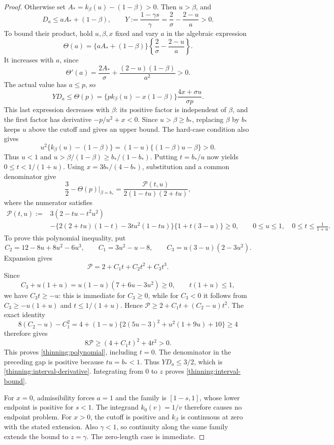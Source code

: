 \begin{proof}
Otherwise set $A_*=k_\beta(u)-(1-\beta)>0$.  Then $u>\beta$,
and
\[
 D_a\le aA_*+(1-\beta),\qquad
 Y:=\frac{1-\gamma s}{\gamma}
 =\frac2\sigma-\frac{2-u}{a}>0.
\]
To bound their product, hold $u,\beta,x$ fixed and vary $a$ in
the algebraic expression
\[
 \Theta(a)=\{aA_*+(1-\beta)\}
 \left\{\frac2\sigma-\frac{2-u}{a}\right\}.
\]
It increases with $a$, since
\[
 \Theta'(a)=\frac{2A_*}{\sigma}
 +\frac{(2-u)(1-\beta)}{a^2}>0.
\]
The actual value has $a\le p$, so
\begin{equation}
\label{thinning:transport-bound}
 YD_a\le\Theta(p)
 =\{p k_\beta(u)-x(1-\beta)\}
   \frac{4x+\sigma u}{\sigma p}.
\end{equation}
This last expression decreases with $\beta$: its positive factor
is independent of $\beta$, and the first factor has derivative
$-p/u^2+x<0$.  Since $u>\beta\ge b_*$, replacing $\beta$ by
$b_*$ keeps $u$ above the cutoff and gives an upper bound.
The hard-case condition also gives
\[
 u^2\{k_\beta(u)-(1-\beta)\}
 =(1-u)\{(1-\beta)u-\beta\}>0.
\]
Thus $u<1$ and
$u>\beta/(1-\beta)\ge b_*/(1-b_*)$.
Putting $t=b_*/u$ now yields $0\le t<1/(1+u)$.
Using $x=3b_*/(4-b_*)$, substitution and a common denominator give
\[
 \frac32-\left.\Theta(p)\right|_{\beta=b_*}
 =\frac{\mathcal P(t,u)}{2(1-tu)(2+tu)},
\]
where the numerator satisfies
\begin{equation}
\label{thinning:polynomial}
 \begin{split}
 \mathcal P(t,u):={}&3(2-tu-t^2u^2)\\
 &-\{2(2+tu)(1-t)-3tu^2(1-tu)\}\{1+t(3-u)\}\ge0,
 \qquad 0\le u\le1,\quad 0\le t\le\frac1{1+u}.
 \end{split}
\end{equation}
To prove this polynomial inequality, put
\[
 C_2=12-8u+8u^2-6u^3,\qquad C_1=3u^2-u-8,\qquad
 C_3=u(3-u)(2-3u^2).
\]
Expansion gives
\begin{equation}
\label{thinning:polynomial-decomposition}
 \mathcal P=2+C_1t+C_2t^2+C_3t^3.
\end{equation}
Since
\[
 C_3+u(1+u)=u(1-u)(7+6u-3u^2)\ge0,
 \qquad t(1+u)\le1,
\]
we have $C_3t\ge-u$: this is immediate for $C_3\ge0$, while for
$C_3<0$ it follows from $C_3\ge-u(1+u)$ and $t\le1/(1+u)$.
Hence $\mathcal P\ge2+C_1t+(C_2-u)t^2$.
The exact identity
\[
 8(C_2-u)-C_1^2
 =4+(1-u)\{2(5u-3)^2+u^2(1+9u)+10\}\ge4
\]
therefore gives
\[
 8\mathcal P\ge(4+C_1t)^2+4t^2>0.
\]
This proves \eqref{thinning:polynomial}, including $t=0$.
The denominator in the preceding gap is positive because
$tu=b_*<1$. Thus $YD_a\le3/2$,
which is \eqref{thinning:interval-derivative}.
Integrating from $0$ to $z$ proves \eqref{thinning:interval-bound}.

For $x=0$, admissibility forces $a=1$ and the family is
$[1-s,1]$, whose lower endpoint is positive for $s<1$.  The
integrand $k_0(v)=1/v$ therefore causes no endpoint problem.
For $x>0$, the cutoff is positive and $k_\beta$ is continuous at
zero with the stated extension.  Also $\gamma<1$, so continuity
along the same family extends the bound to $z=\gamma$.
The zero-length case is immediate.
\end{proof}

